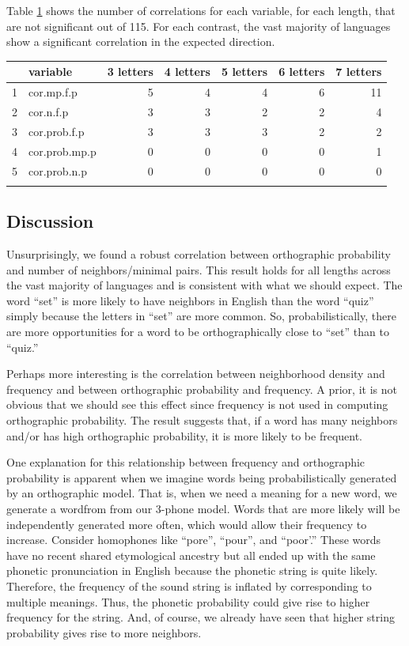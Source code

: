 \documentclass{article}
\begin{document}
Table \ref{cor.table} shows the number of correlations for each variable, for each length, that are not
significant out of 115. For each contrast, the vast majority of languages show a significant correlation in
the expected direction.

\begin{table}[ht]
\centering
\begin{tabular}{rlrrrrr}
  \hline
 & variable & 3  letters & 4  letters & 5  letters & 6  letters & 7  letters \\ 
  \hline
1 & cor.mp.f.p &   5 &   4 &   4 &   6 &  11 \\ 
  2 & cor.n.f.p &   3 &   3 &   2 &   2 &   4 \\ 
  3 & cor.prob.f.p &   3 &   3 &   3 &   2 &   2 \\ 
  4 & cor.prob.mp.p &   0 &   0 &   0 &   0 &   1 \\ 
  5 & cor.prob.n.p &   0 &   0 &   0 &   0 &   0 \\ 
   \hline
\label{cor.table}
\end{tabular}
\end{table}


\subsection{Discussion}

Unsurprisingly, we found a robust correlation between orthographic probability and number of neighbors/minimal
pairs. This result holds for all lengths across the vast majority of languages and is consistent with what we
should expect. The word ``set'' is more likely to have neighbors in English than the word ``quiz'' simply
because the letters in ``set'' are more common. So, probabilistically, there are more opportunities for a word
to be orthographically close to ``set'' than to ``quiz.''

Perhaps more interesting is the correlation between neighborhood density and frequency and between orthographic
probability and frequency. A prior, it is not obvious that we should see this effect since frequency is not
used in computing orthographic probability. The result suggests that, if a word has many neighbors and/or has
high orthographic probability, it is
more likely to be frequent. 

One explanation for this relationship between frequency and orthographic probability is apparent when we
imagine words being probabilistically generated by an orthographic model. That is, when we need a meaning for
a new word, we generate a wordfrom from our 3-phone model. Words that are more likely will be independently generated more
often, which would allow their frequency to increase. Consider homophones like ``pore'', ``pour'', and
``poor'.'' These words have no recent shared etymological ancestry but all ended up with the same phonetic
pronunciation in English because the phonetic string is quite likely. Therefore, the frequency of the sound
string is inflated by corresponding to multiple meanings. Thus, the phonetic probability could give rise to
higher frequency for the string. And, of course, we already have seen that higher string probability gives
rise to more neighbors.
\end{document}
